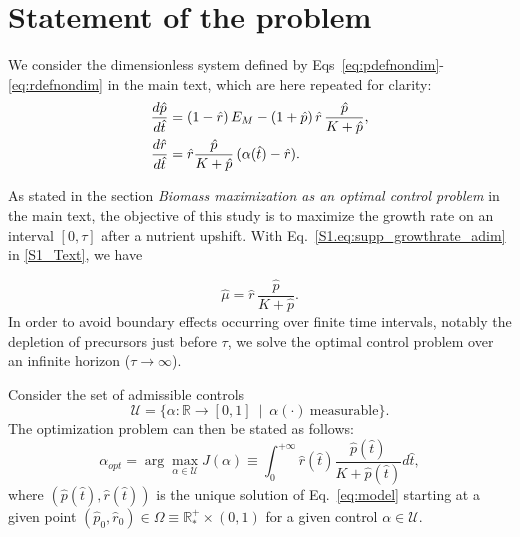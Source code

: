 \documentclass[a4paper,12pt]{article}
\newcommand{\tr}[1]{{#1}}
\begin{document}
\begin{flushleft}
{\Large
\textbf{}
}
\newline

\end{flushleft}
\section{Statement of the problem}

We consider the dimensionless system defined by Eqs~\ref{eq:pdefnondim}-\ref{eq:rdefnondim} in the main text, which are here repeated for clarity:
\begin{equation}{\label{eq:model}}
\begin{aligned}
\frac{d\hat{p}}{d\hat{t}} &= (1-\hat{r})\, E_M - (1+\hat{p})\, \hat{r} \, \frac{\hat{p}}{K+\hat{p}}, \\
\frac{d\hat{r}}{d\hat{t}} &= \hat{r} \frac{\hat{p}}{K + \hat{p}} \, (\alpha (\hat{t}) - \hat{r}).
\end{aligned}
\end{equation}

\tr{As stated in the section \textit{Biomass maximization as an optimal control problem} in the main text, the objective of this study is to maximize the growth rate on an interval $[0,\tau]$ after a nutrient upshift. With Eq.~\ref{S1.eq:supp_growthrate_adim} in \ref{S1_Text}, we have
 
\begin{equation*}
\hat{\mu}= \hat{r}\, \dfrac{\hat{p}}{K+\hat{p}}.
\end{equation*}
In order to avoid boundary effects occurring over finite time intervals, notably the depletion of precursors just before $\tau$, we solve the optimal control problem over an infinite horizon ($\tau \rightarrow \infty$).} Consider the set of admissible controls
\[
\mathcal{U}=\{\alpha:\mathbb{R} \rightarrow [0,1] \ \mid \ \alpha(\cdot) \ \mathrm{measurable}\}.
\]
The optimization problem can then be stated as follows:
\begin{equation}\label{Prob}
\tr{\alpha_{opt} = \arg \max_{\alpha \in \mathcal{U}} J(\alpha)\equiv \int_0^{+\infty} \hat{r}(\hat{t}) \frac{\hat{p}(\hat{t})}{K + \hat{p}(\hat{t})} d\hat{t} ,} 
\end{equation}
where $(\hat{p}(\hat{t}),\hat{r}(\hat{t}))$ is the unique solution of Eq.~\ref{eq:model} starting at a given point $(\hat{p}_0,\hat{r}_0)\in \Omega \equiv \mathbb{R}^+_* \times (0,1)$ for a given control $\alpha\in \mathcal{U}$.
\end{document}
